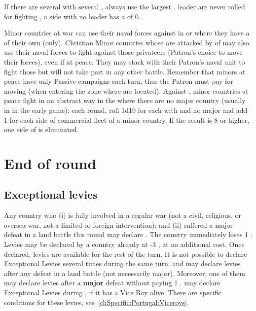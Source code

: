 If there are several \corsaire with several \LeaderP, always use the largest
\Man.  leader are never rolled for fighting \corsaire, a
side with no leader has a \Man of 0.

\bparag Minor countries at war can use their naval forces against \corsaire in
\STZ or \CTZ where they have a \TradeFLEET of their own (only).
\bparag Christian Minor countries whose \TradeFLEET are attacked by \corsaire
of \Barbaresques may also use their naval forces to fight against those
privateers (Patron's choice to move their forces), even if at peace. They may
stack with their Patron's naval unit to fight those \corsaire but will not
take part in any other battle.
\bparag Remember that minors at peace have only Passive campaigns each turn,
thus the Patron must pay for moving (when entering the zone where \corsaire
are located).
\bparag Against , minor countries at peace fight in an abstract
way in the \STZ where there are no major country \TradeFLEET (usually in
 in the early game): each round, roll 1d10 for each \STZ with
 \corsaire and no major \TradeFLEET and add 1 for each side of
commercial fleet of a minor country.  If the result is 8 or higher, one
side of \corsaire is eliminated.

\section{End of round}
\label{chMilitary:End of round}
\subsection{Exceptional levies}
\label{chMilitary:Exceptional Levies}

\bparag Any country who (i) is fully involved in a regular war (not a civil,
religious, or oversea war, not a limited or foreign intervention); and (ii)
suffered a major defeat in a land battle this round may declare
.
\bparag The country immediately loses 1 \STAB. Levies may be declared by a
country already at -3 \STAB, at no additional cost.
\bparag Once declared, levies are available for the rest of the turn. It is
not possible to declare Exceptional Levies several times during the same
turn.
\bparag[Exception:] \SUE and \PRU may declare levies after any defeat in a land
battle (not necessarily major). Moreover, one of them may declare levies after
a \textbf{major} defeat without paying 1 \STAB.
\bparag[Exception:] \POR may declare Exceptional Levies during , if it has a Vice Roy alive. There are specific conditions for these
levies, see~\ref{chSpecific:Portugal:Viceroys}.

